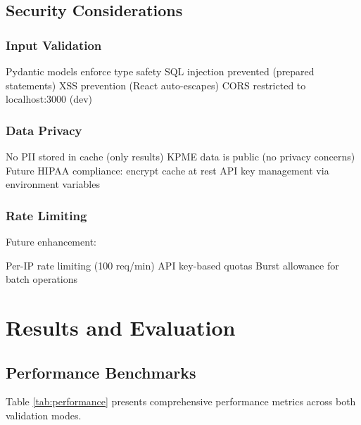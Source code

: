 \documentclass[conference]{IEEEtran}
\begin{document}
\subsection{Security Considerations}

\subsubsection{Input Validation}

Pydantic models enforce type safety
SQL injection prevented (prepared statements)
XSS prevention (React auto-escapes)
CORS restricted to localhost:3000 (dev)

\subsubsection{Data Privacy}

No PII stored in cache (only results)
KPME data is public (no privacy concerns)
Future HIPAA compliance: encrypt cache at rest
API key management via environment variables

\subsubsection{Rate Limiting}

Future enhancement:

Per-IP rate limiting (100 req/min)
API key-based quotas
Burst allowance for batch operations

\section{Results and Evaluation}

\subsection{Performance Benchmarks}

Table \ref{tab:performance} presents comprehensive performance metrics across both validation modes.
\end{document}
